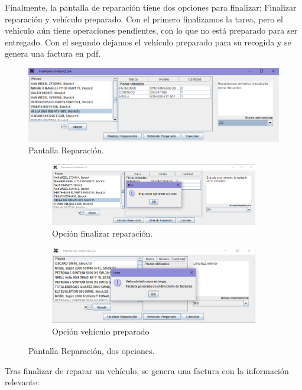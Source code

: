 \documentclass{article}
\begin{document}
  Finalmente, la pantalla de reparación tiene dos opciones para finalizar: Finalizar reparación y vehículo preparado. Con el primero finalizamos la tarea, pero el vehículo aún tiene
  operaciones pendientes, con lo que no está preparado para ser entregado. Con el segundo dejamos el vehículo preparado para su recogida y se genera una factura en pdf. 
  \begin{figure}[H]
    \centering
    \includegraphics[width=1.0\textwidth]{program/capturasEjec/reparacion.PNG}
    \caption{Pantalla Reparación.}
  \end{figure}
  \begin{figure}[H]
    \centering
    \begin{subfigure}{.5\textwidth}
      \centering
      \includegraphics[width=0.9\linewidth]{program/capturasEjec/reparacion2.PNG}
      \caption{Opción finalizar reparación.}
    \end{subfigure}%
    \begin{subfigure}{.5\textwidth}
      \centering
      \includegraphics[width=0.9\linewidth]{program/capturasEjec/reparacion3.PNG}
      \caption{Opción vehículo preparado}
    \end{subfigure}
    \caption{Pantalla Reparación, dos opciones.}
  \end{figure}
  Tras finalizar de reparar un vehículo, se genera una factura con la información relevante: 
\end{document}
